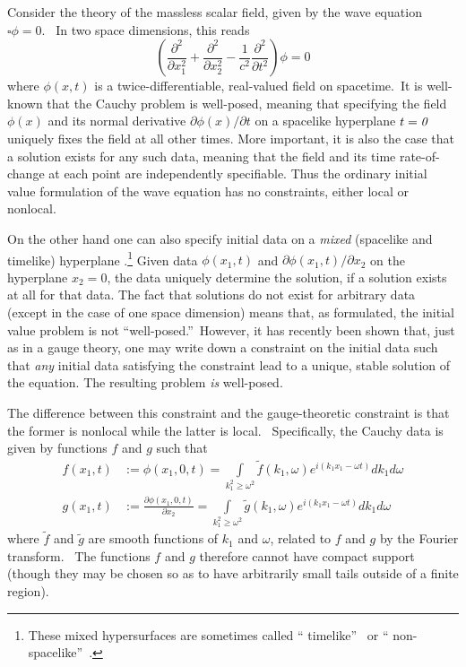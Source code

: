 \documentclass[12pt]{article}%
\begin{document}
Consider the theory of the massless scalar field, given by the wave equation
$\square\phi=0$. \ In two space dimensions, this reads%
\begin{equation}
\left(  \frac{\partial^{2}}{\partial x_{1}^{2}}+\frac{\partial^{2}}{\partial
x_{2}^{2}}-\frac{1}{c^{2}}\frac{\partial^{2}}{\partial t^{2}}\right)  \phi=0
\end{equation}
where $\phi(x,t)$ is a twice-differentiable, real-valued field on
spacetime.\ It is well-known that the Cauchy problem is well-posed, meaning
that specifying the field $\phi(x)$ and its normal derivative $\partial
\phi(x)/\partial t$ on a spacelike hyperplane $t=\emph{0}$ uniquely fixes the
field at all other times. More important, it is also the case that a solution
exists for any such data, meaning that the field and its time rate-of-change
at each point are independently specifiable. Thus the ordinary initial value
formulation of the wave equation has no constraints, either local or nonlocal.

On the other hand one can also specify initial data on a \emph{mixed}
(spacelike and timelike) hyperplane \cite{Joh91}.\footnote{These mixed
hypersurfaces are sometimes called \textquotedblleft
timelike\textquotedblright\ \cite{Joh91} or \textquotedblleft
non-spacelike\textquotedblright\ \cite{Cou62}.} Given data $\phi(x_{1},t)$ and
$\partial\phi(x_{1},t)/\partial x_{2}$ on the hyperplane $x_{2}=0$, the data
uniquely determine the solution, if a solution exists at all for that data.
The fact that solutions do not exist for arbitrary data (except in the case of
one space dimension) means that, as formulated, the initial value problem is
not \textquotedblleft well-posed.\textquotedblright\ However, it has recently
been shown \cite{CW08} that, just as in a gauge theory, one may write down a
constraint on the initial data such that \emph{any} initial data satisfying
the constraint lead to a unique, stable solution of the equation. The
resulting problem \emph{is} well-posed.

The difference between this constraint and the gauge-theoretic constraint is
that the former is nonlocal while the latter is local. \ Specifically, the
Cauchy data is given by functions $f$ and $g$ such that
\begin{align}
f(x_{1},t)  &  :=\phi(x_{1},0,t) = %
{\displaystyle\int\limits_{k_{1}^{2}\geq\omega^{2}}}
\tilde{f}(k_{1},\omega)e^{i(k_{1}x_{1}-\omega t)}dk_{1}d\omega\\
g(x_{1},t)  &  :=\frac{\partial\phi(x_{1},0,t)}{\partial x_{2}} = %
{\displaystyle\int\limits_{k_{1}^{2}\geq\omega^{2}}}
\tilde{g}(k_{1},\omega)e^{i(k_{1}x_{1}-\omega t)}dk_{1}d\omega\nonumber
\end{align}
where $\tilde{f}$ and $\tilde{g}$ are smooth functions of $k_{1}$ and $\omega
$, related to $f$ and $g$ by the Fourier transform. \ The functions $f $ and
$g$ therefore cannot have compact support (though they may be chosen so as to
have arbitrarily small tails outside of a finite region).
\end{document}
